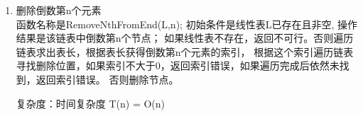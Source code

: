 \documentclass[supercite]{Experimental_Report}
\theoremstyle{definition}
\begin{document}
\begin{enumerate}
	\item 删除倒数第n个元素\\
	函数名称是RemoveNthFromEnd(L,n); 初始条件是线性表L已存在且非空, 操作结果是该链表中倒数第n个节点；
	如果线性表不存在，返回不可行。否则遍历链表求出表长，根据表长获得倒数第n个元素的索引，
	根据这个索引遍历链表寻找删除位置，如果索引不大于0，返回索引错误，如果遍历完成后依然未找到，返回索引错误。
	否则删除节点。
	
	复杂度：时间复杂度 T(n) = O(n)
	\begin{figure}[htbp]
		\centering
		\begin{minipage}{0.7\linewidth}
			\centering

\end{minipage}
\end{figure}
\end{enumerate}
\end{document}
